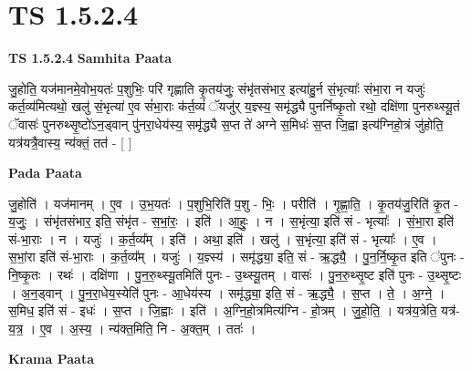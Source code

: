 \documentclass[17pt]{extarticle}
\begin{document}
\section{ TS 1.5.2.4 }

\textbf{TS 1.5.2.4 } \newline
\textbf{Samhita Paata} \newline

जु॒होति॒ यज॑मानमे॒वोभ॒यतः॑ प॒शुभिः॒ परि॑ गृह्णाति कृ॒तय॑जुः॒ संभृ॑तसंभार॒ इत्या॑हु॒र्न सं॒भृत्याः᳚ संभा॒रा न यजुः॑ कर्त॒व्य॑मित्यथो॒ खलु॑ सं॒भृत्या॑ ए॒व सं॑भा॒राः क॑र्त॒व्यं॑ ॅयजु॑र् य॒ज्ञ्स्य॒ समृ॑द्ध्यै पुनर्निष्कृ॒तो रथो॒ दक्षि॑णा पुनरुथ्स्यू॒तं ॅवासः॑ पुनरुथ्सृ॒ष्टो॑ऽन॒ड्वान् पु॑नरा॒धेय॑स्य॒ समृ॑द्ध्यै स॒प्त ते॑ अग्ने स॒मिधः॑ स॒प्त जि॒ह्वा इत्य॑ग्निहो॒त्रं जु॑होति॒ यत्र॑यत्रै॒वास्य॒ न्य॑क्तं॒ तत॑ - [ ] \newline

\textbf{Pada Paata} \newline

जु॒होति॑ । यज॑मानम् । ए॒व । उ॒भ॒यतः॑ । प॒शुभि॒रिति॑ प॒शु - भिः॒ । परीति॑ । गृ॒ह्णा॒ति॒ । कृ॒तय॑जु॒रिति॑ कृ॒त - य॒जुः॒ । संभृ॑तसंभार॒ इति॒ संभृ॑त - स॒भां॒रः॒ । इति॑ । आ॒हुः॒ । न । स॒भृंत्या॒ इति॑ सं - भृत्याः᳚ । सं॒भा॒रा इति॑ सं-भा॒राः । न । यजुः॑ । क॒र्त॒व्य᳚म् । इति॑ । अथा॒ इति॑ । खलु॑ । स॒भृंत्या॒ इति॑ सं - भृत्याः᳚ । ए॒व । स॒भां॒रा इति॑ सं-भा॒राः । क॒र्त॒व्य᳚म् । यजुः॑ । य॒ज्ञ्स्य॑ । समृ॑द्ध्या॒ इति॒ सं - ऋ॒द्ध्यै॒ । पु॒न॒र्नि॒ष्कृ॒त इति ॑पुनः - नि॒ष्कृ॒तः । रथः॑ । दक्षि॑णा । पु॒न॒रु॒थ्स्यू॒तमिति॑ पुनः - उ॒थ्स्यू॒तम् । वासः॑ । पु॒न॒रु॒थ्सृ॒ष्ट इति॑ पुनः - उ॒थ्सृ॒ष्टः । अ॒न॒ड्वान् । पु॒न॒रा॒धेय॒स्येति॑ पुनः - आ॒धेय॑स्य । समृ॑द्ध्या॒ इति॒ सं - ऋ॒द्ध्यै॒ । स॒प्त । ते॒ । अ॒ग्ने॒ । स॒मिध॒ इति॑ सं - इधः॑ । स॒प्त । जि॒ह्वाः । इति॑ । अ॒ग्नि॒हो॒त्रमित्य॑ग्नि - हो॒त्रम् । जु॒हो॒ति॒ । यत्र॑य॒त्रेति॒ यत्र॑-य॒त्र॒ । ए॒व । अ॒स्य॒ । न्य॑क्त॒मिति॒ नि - अ॒क्त॒म् । ततः॑ ।  \newline


\textbf{Krama Paata} \newline
\end{document}
